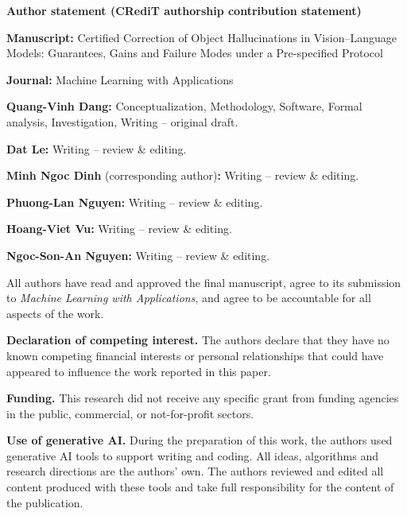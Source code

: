 \documentclass[11pt,a4paper]{article}
\begin{document}
{\large\bfseries Author statement (CRediT authorship contribution statement)}

\textbf{Manuscript:} Certified Correction of Object Hallucinations in Vision--Language Models: Guarantees, Gains and Failure Modes under a Pre-specified Protocol

\textbf{Journal:} Machine Learning with Applications

\bigskip
\textbf{Quang-Vinh Dang:} Conceptualization, Methodology, Software, Formal analysis, Investigation, Writing -- original draft.

\textbf{Dat Le:} Writing -- review \& editing.

\textbf{Minh Ngoc Dinh} (corresponding author)\textbf{:} Writing -- review \& editing.

\textbf{Phuong-Lan Nguyen:} Writing -- review \& editing.

\textbf{Hoang-Viet Vu:} Writing -- review \& editing.

\textbf{Ngoc-Son-An Nguyen:} Writing -- review \& editing.

\bigskip
All authors have read and approved the final manuscript, agree to its submission to \emph{Machine Learning with Applications}, and agree to be accountable for all aspects of the work.

\textbf{Declaration of competing interest.} The authors declare that they have no known competing financial interests or personal relationships that could have appeared to influence the work reported in this paper.

\textbf{Funding.} This research did not receive any specific grant from funding agencies in the public, commercial, or not-for-profit sectors.

\textbf{Use of generative AI.} During the preparation of this work, the authors used generative AI tools to support writing and coding. All ideas, algorithms and research directions are the authors' own. The authors reviewed and edited all content produced with these tools and take full responsibility for the content of the publication.
\end{document}

